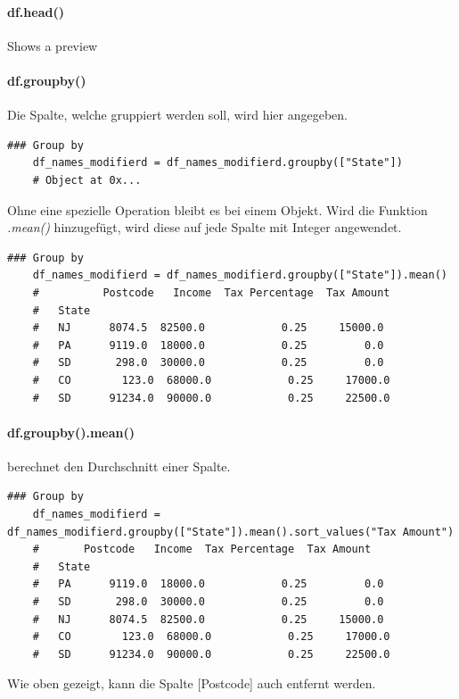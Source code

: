 \paragraph*{df.head()} Shows a preview

\paragraph*{df.groupby()} Die Spalte, welche gruppiert werden soll, wird hier angegeben. 
\begin{lstlisting}[style=python]
	### Group by
	df_names_modifierd = df_names_modifierd.groupby(["State"]) 
	# Object at 0x...
\end{lstlisting}
Ohne eine spezielle Operation bleibt es bei einem Objekt. Wird die Funktion \textit{.mean()} hinzugefügt, wird diese auf jede Spalte mit Integer angewendet.
\begin{lstlisting}[style=python]
	### Group by
	df_names_modifierd = df_names_modifierd.groupby(["State"]).mean()
	#	       Postcode   Income  Tax Percentage  Tax Amount
	#	State
	#	NJ      8074.5  82500.0            0.25     15000.0
	#	PA      9119.0  18000.0            0.25         0.0
	#	SD       298.0  30000.0            0.25         0.0
	#	CO        123.0  68000.0            0.25     17000.0
	#	SD      91234.0  90000.0            0.25     22500.0
\end{lstlisting}

\paragraph*{df.groupby().mean()} berechnet den Durchschnitt einer Spalte.
\begin{lstlisting}[style=python]
	### Group by
	df_names_modifierd = df_names_modifierd.groupby(["State"]).mean().sort_values("Tax Amount")		
	#       Postcode   Income  Tax Percentage  Tax Amount
	#	State
	#	PA      9119.0  18000.0            0.25         0.0
	#	SD       298.0  30000.0            0.25         0.0
	#	NJ      8074.5  82500.0            0.25     15000.0
	#	CO        123.0  68000.0            0.25     17000.0
	#	SD      91234.0  90000.0            0.25     22500.0
\end{lstlisting}
Wie oben gezeigt, kann die Spalte [Postcode] auch entfernt werden.

